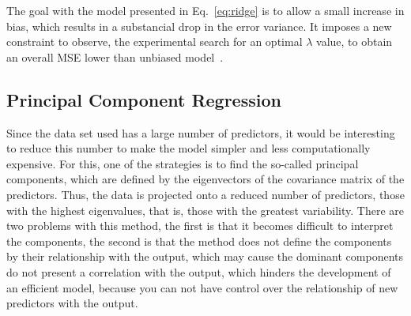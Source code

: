 The goal with the model presented in Eq.~\ref{eq:ridge} is to allow a small increase in bias, which results in a substancial drop in the error variance. It imposes a new constraint to observe, the experimental search for an optimal $\lambda$ value, to obtain an overall MSE lower than unbiased model~\cite{James2013, Kuhn2013}.

\subsection{Principal Component Regression}
Since the data set used has a large number of predictors, it would be interesting to reduce this number to make the model simpler and less computationally expensive.
 For this, one of the strategies is to find the so-called principal components, which are defined by the eigenvectors of the covariance matrix of the predictors. Thus, the data is projected onto a reduced number of predictors, those with the highest eigenvalues, that is, those with the greatest variability. There are two problems with this method, the first is that it becomes difficult to interpret the components, the second is that the method does not define the components by their relationship with the output, which may cause the dominant components do not present a correlation with the output, which hinders the development of an efficient model, because you can not have control over the relationship of new predictors with the output.

